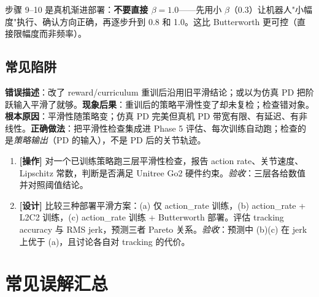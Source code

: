 步骤 9--10 是真机渐进部署：\textbf{不要直接 $\beta=1.0$}——先用小 $\beta$（0.3）让机器人"小幅度"执行、确认方向正确，再逐步升到 0.8 和 1.0。这比 Butterworth 更可控（直接限幅度而非频率）。

\subsection{常见陷阱}

\begin{pitfall}
\textbf{错误描述}：改了 reward/curriculum 重训后沿用旧平滑结论；或以为仿真 PD 把阶跃输入平滑了就够。\textbf{现象后果}：重训后的策略平滑性变了却未复检；检查错对象。\textbf{根本原因}：平滑性随策略变；仿真 PD 完美但真机 PD 带宽有限、有延迟、有非线性。\textbf{正确做法}：把平滑性检查集成进 Phase 5 评估、每次训练自动跑；检查的是\emph{策略输出}（PD 的输入），不是 PD 后的关节轨迹。
\end{pitfall}

\begin{practice}[本节动手任务]
\begin{enumerate}
  \item \textbf{[操作]} 对一个已训练策略跑三层平滑性检查，报告 action rate、关节速度、Lipschitz 常数，判断是否满足 Unitree Go2 硬件约束。\emph{验收}：三层各给数值并对照阈值结论。
  \item \textbf{[设计]} 比较三种部署平滑方案：(a) 仅 action\_rate 训练，(b) action\_rate + L2C2 训练，(c) action\_rate 训练 + Butterworth 部署。评估 tracking accuracy 与 RMS jerk，预测三者 Pareto 关系。\emph{验收}：预测中 (b)(c) 在 jerk 上优于 (a)，且讨论各自对 tracking 的代价。
\end{enumerate}
\end{practice}

\section*{常见误解汇总}
\label{sec:rlmc-diag-myths}

